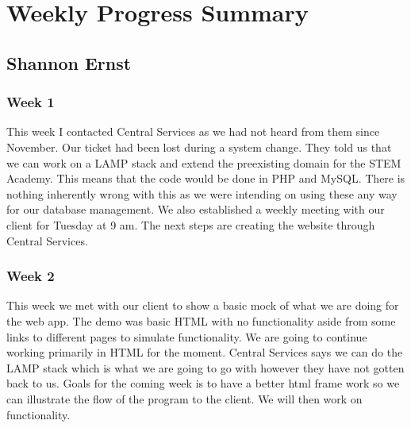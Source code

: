 \documentclass[letterpaper,10pt,serif, draftclsnofoot,onecolumn, compsoc, titlepage]{IEEEtran}
\begin{document}
\section{Weekly Progress Summary}
\subsection{Shannon Ernst}
\subsubsection{Week 1}
This week I contacted Central Services as we had not heard from them since November.
Our ticket had been lost during a system change.
They told us that we can work on a LAMP stack and extend the preexisting domain for the STEM Academy.
This means that the code would be done in PHP and MySQL.
There is nothing inherently wrong with this as we were intending on using these any way for our database management.
We also established a weekly meeting with our client for Tuesday at 9 am.
The next steps are creating the website through Central Services.
\subsubsection{Week 2}
This week we met with our client to show a basic mock of what we are doing for the web app. The demo was basic HTML with no 
functionality aside from some links to different pages to simulate functionality. 
We are going to continue working primarily in HTML for the moment.
Central Services says we can do the LAMP stack which is what we are going to go with however they have not gotten back to us.
Goals for the coming week is to have a better html frame work so we can illustrate the flow of the program to the client.
We will then work on functionality.
\end{document}
